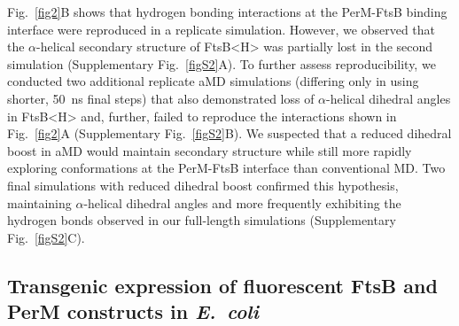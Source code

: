\documentclass[pdflatex,sn-nature]{sn-jnl}%
\def\textsuperscript#1{<#1>}%
\newcommand\ec{\textit{E.~coli}}
\newcommand\ftsbH{FtsB\textsuperscript{H}}
\begin{document}
Fig.~\ref{fig2}B shows that hydrogen bonding interactions at the PerM-FtsB binding interface were reproduced in a replicate simulation.
However, we observed that the $\alpha$-helical secondary structure of \ftsbH{} was partially lost in the second simulation (Supplementary Fig.~\ref{figS2}A).
To further assess reproducibility, we conducted two additional replicate aMD simulations (differing only in using shorter, \qty{50}{\ns} final steps) that also demonstrated loss of $\alpha$-helical dihedral angles in \ftsbH{} and, further, failed to reproduce the interactions shown in Fig.~\ref{fig2}A (Supplementary Fig.~\ref{figS2}B).
We suspected that a reduced dihedral boost in aMD would maintain secondary structure while still more rapidly exploring conformations at the PerM-FtsB interface than conventional MD.
Two final simulations with reduced dihedral boost confirmed this hypothesis, maintaining $\alpha$-helical dihedral angles and more frequently exhibiting the hydrogen bonds observed in our full-length simulations (Supplementary Fig.~\ref{figS2}C).

\subsection{Transgenic expression of fluorescent FtsB and PerM constructs in \ec{}}
\end{document}
